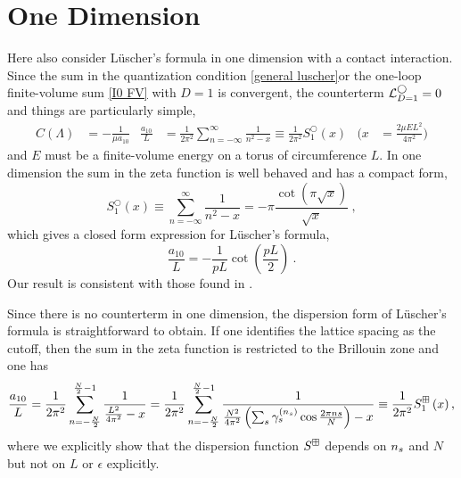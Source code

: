 \section{One Dimension}\label{sec:1D}

Here also consider L\"uscher's formula in one dimension with a contact interaction.
Since the sum in the quantization condition \eqref{general luscher}or the one-loop finite-volume sum \eqref{I0 FV} with $D=1$ is convergent, the counterterm $\mathcal{L}_{D=1}^\bigcirc=0$ and things are particularly simple,
\begin{align}
    C(\Lambda)
        &=
            -\frac{1}{\mu a_{10}}
    &
    \frac{a_{10}}{L}
        &=
            \frac{1}{2 \pi^{2}}
            \sum_{n=-\infty}^{\infty} \frac{1}{n^{2}-x}
        \equiv
            \frac{1}{2 \pi^{2}}
            S^\bigcirc_{1}\left(x\right)
    &
    \Bigg(x
        &=
            \frac{2\mu E L^2}{4\pi^2}\Bigg)
\end{align}
and $E$ must be a finite-volume energy on a torus of circumference $L$.
In one dimension the sum in the zeta function is well behaved and has a compact form,
\begin{equation}\label{eq:1d luscher}
S^\bigcirc_{1}(x) \equiv \sum_{n=-\infty}^{\infty} \frac{1}{n^{2}-x}=-\pi \frac{\cot (\pi \sqrt{x})}{\sqrt{x}}\ ,
\end{equation}
which gives a closed form expression for L\"uscher's formula,
\begin{equation}\label{eq:1d luscher}
\frac{a_{10}}{L} =-\frac{1}{pL}\cot\left(\frac{pL}{2}\right)\ .
\end{equation}
Our result is consistent with those found in \cite{}.

Since there is no counterterm in one dimension, the dispersion form of L\"uscher's formula is straightforward to obtain.  If one identifies the lattice spacing as the cutoff, then the sum in the zeta function is restricted to the Brillouin zone and one has
\begin{equation}
    \frac{a_{10}}{L}
    =
    \frac{1}{2 \pi^{2}} \sum_{n=-\frac{N}{2}}^{\frac{N}{2}-1} \frac{1}{\frac{L^2}{4\pi^2}-x}
    =
    \frac{1}{2 \pi^{2}} \sum_{n=-\frac{N}{2}}^{\frac{N}{2}-1} \frac{1}{\frac{N^2}{4\pi^2}\left(\sum_{s}\gamma_s^{({n_s})}\cos\frac{2\pi n s}{N}\right)-x}
    \equiv
    \frac{1}{2 \pi^{2}} S^{\boxplus}_{1}\left(x\right),\label{eq:1d dispersion luscher}
\end{equation}
where we explicitly show that the dispersion function $S^{\boxplus}$ depends on ${n_s}$ and $N$ but not on $L$ or $\epsilon$ explicitly.


